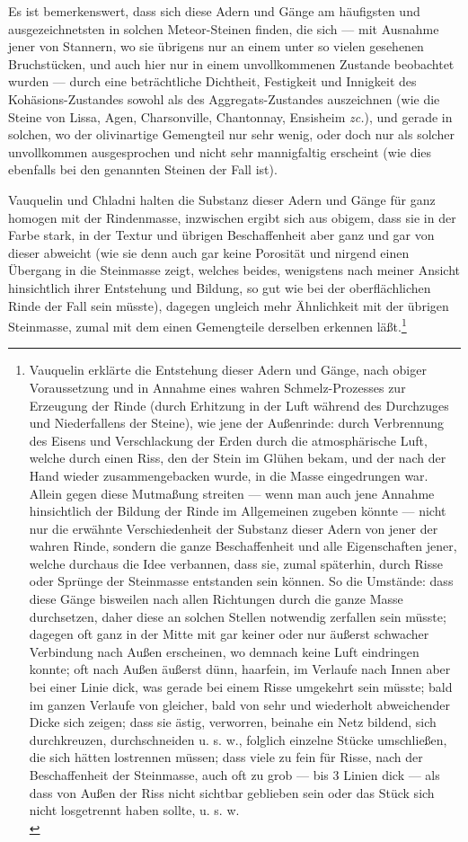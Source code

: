 \documentclass[a4paper, 11pt, oneside, german]{article}
\begin{document}
Es ist bemerkenswert, dass sich diese Adern und Gänge am häufigsten und ausgezeichnetsten in solchen Meteor-Steinen finden, die sich --- mit Ausnahme jener von Stannern, wo sie übrigens nur an einem unter so vielen gesehenen Bruchstücken, und auch hier nur in einem unvollkommenen Zustande beobachtet wurden --- durch eine beträchtliche Dichtheit, Festigkeit und Innigkeit des Kohäsions-Zustandes sowohl als des Aggregats-Zustandes auszeichnen (wie die Steine von Lissa, Agen, Charsonville, Chantonnay, Ensisheim \emph{zc.}), und gerade in solchen, wo der olivinartige Gemengteil nur sehr wenig, oder doch nur als solcher unvollkommen ausgesprochen und nicht sehr mannigfaltig erscheint (wie dies ebenfalls bei den genannten Steinen der Fall ist).

Vauquelin und Chladni halten die Substanz dieser Adern und Gänge für ganz homogen mit der Rindenmasse, inzwischen ergibt sich aus obigem, dass sie in der Farbe stark, in der Textur und übrigen Beschaffenheit aber ganz und gar von dieser abweicht (wie sie denn auch gar keine Porosität und nirgend einen Übergang in die Steinmasse zeigt, welches beides, wenigstens nach meiner Ansicht hinsichtlich ihrer Entstehung und Bildung, so gut wie bei der oberflächlichen Rinde der Fall sein müsste), dagegen ungleich mehr Ähnlichkeit mit der übrigen Steinmasse, zumal mit dem einen Gemengteile derselben erkennen läßt.\footnote{Vauquelin erklärte die Entstehung dieser Adern und Gänge, nach obiger Voraussetzung und in Annahme eines wahren Schmelz-Prozesses zur Erzeugung der Rinde (durch Erhitzung in der Luft während des Durchzuges und Niederfallens der Steine), wie jene der Außenrinde: durch Verbrennung des Eisens und Verschlackung der Erden durch die atmosphärische Luft, welche durch einen Riss, den der Stein im Glühen bekam, und der nach der Hand wieder zusammengebacken wurde, in die Masse eingedrungen war. Allein gegen diese Mutmaßung streiten --- wenn man auch jene Annahme hinsichtlich der Bildung der Rinde im Allgemeinen zugeben könnte --- nicht nur die erwähnte Verschiedenheit der Substanz dieser Adern von jener der wahren Rinde, sondern die ganze Beschaffenheit und alle Eigenschaften jener, welche durchaus die Idee verbannen, dass sie, zumal späterhin, durch Risse oder Sprünge der Steinmasse entstanden sein können. So die Umstände: dass diese Gänge bisweilen nach allen Richtungen durch die ganze Masse durchsetzen, daher diese an solchen Stellen notwendig zerfallen sein müsste; dagegen oft ganz in der Mitte mit gar keiner oder nur äußerst schwacher Verbindung nach Außen erscheinen, wo demnach keine Luft eindringen konnte; oft nach Außen äußerst dünn, haarfein, im Verlaufe nach Innen aber bei einer Linie dick, was gerade bei einem Risse umgekehrt sein müsste; bald im ganzen Verlaufe von gleicher, bald von sehr und wiederholt abweichender Dicke sich zeigen; dass sie ästig, verworren, beinahe ein Netz bildend, sich durchkreuzen, durchschneiden u. s. w., folglich einzelne Stücke umschließen, die sich hätten lostrennen müssen; dass viele zu fein für Risse, nach der Beschaffenheit der Steinmasse, auch oft zu grob --- bis 3 Linien dick --- als dass von Außen der Riss nicht sichtbar geblieben sein oder das Stück sich nicht losgetrennt haben sollte, u. s. w.\\
}
\end{document}
